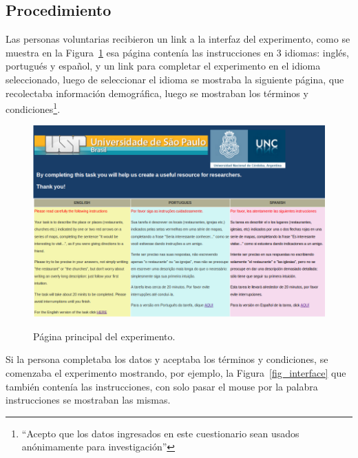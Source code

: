 \subsection{Procedimiento}
\label{corpus-metodo}

Las personas voluntarias recibieron un link a la interfaz del experimento, como se muestra en la Figura~\ref{fig_pagPrincipal_seleccion_idioma} esa p\'agina conten\'{i}a las instrucciones en 3 idiomas: ingl\'es, portugu\'es y espa\~{n}ol, y un link para completar el experimento en el idioma seleccionado, luego de seleccionar el idioma se mostraba la siguiente p\'agina, que recolectaba informaci\'on demogr\'afica, luego se mostraban los t\'erminos y condiciones\footnote{%
    ``Acepto que los datos ingresados en este cuestionario sean usados an\'onimamente para investigaci\'on''
  }. 
\begin{figure}[ht]
\begin{center}
\includegraphics[width=17cm]{images/pagPrincipal.png}\\[0pt]
\caption{P\'agina principal del experimento.}
\label{fig_pagPrincipal_seleccion_idioma}
\end{center}
\end{figure}

Si la persona completaba los datos y aceptaba los t\'erminos y condiciones, se comenzaba el experimento mostrando, por ejemplo, la Figura~\ref{fig_interface} que tambi\'en conten\'{i}a las instrucciones, con solo pasar el mouse por la palabra instrucciones se mostraban las mismas.

